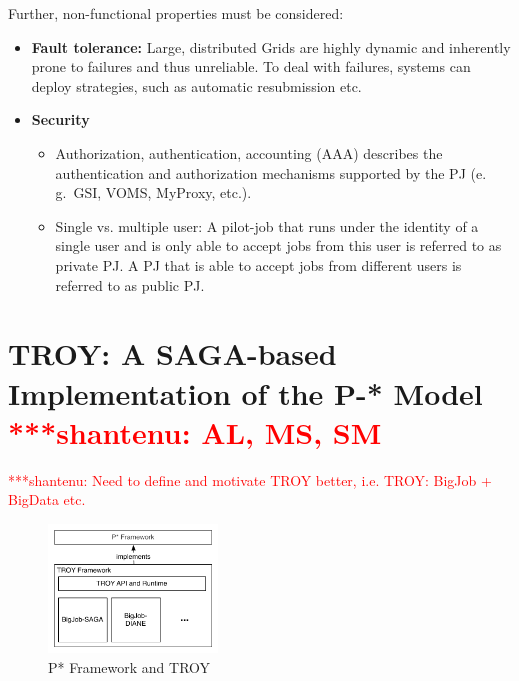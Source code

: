 \documentclass[conference,final]{IEEEtran}
\newcommand{\jhanote}[1]{ {\textcolor{red} { ***shantenu: #1 }}}
\newcommand{\msnote}[1]{ {\textcolor{cyan} { ***mark: #1 }}}
\newcommand{\jhanote}[1]{}
\newcommand{\msnote}[1]{}
\begin{document}
Further, non-functional properties must be considered:
\begin{itemize}
		\item \textbf{Fault tolerance:} Large, distributed Grids are highly dynamic 
		and inherently prone to failures and thus unreliable. To deal with failures, 
		systems can deploy strategies, such as automatic resubmission etc.
		\item \textbf{Security}
		\begin{itemize}
	       \item Authorization, authentication, accounting (AAA) describes the 
	       authentication and authorization mechanisms supported by the PJ (e.\,g.\  
	       GSI, VOMS, MyProxy, etc.). 
		   \item Single vs. multiple user: A pilot-job that runs under the identity 
		   of a single user and is only able to accept jobs from this user is 
		   referred to as private PJ. A PJ that is able to accept jobs from 
		   different users is referred to as public PJ.
		\end{itemize}
\end{itemize}





\section{TROY: A SAGA-based Implementation of the P-* Model
  \jhanote{AL, MS, SM}}


\jhanote{Need to define and motivate TROY better, i.e. TROY: BigJob +
  BigData etc.}

\begin{figure}[t]
	\centering
		\includegraphics[width=0.4\textwidth]{figures/pstar_troy.pdf}
	\caption{P* Framework and TROY}
	\label{fig:figures_pstar_troy}
\end{figure}
\end{document}
